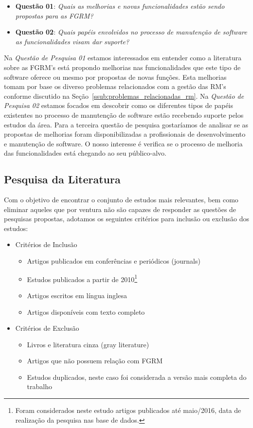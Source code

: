 \begin{itemize}
	\item \textbf{Questão 01}: \textit{Quais as melhorias e novas
			funcionalidades estão sendo propostas para as FGRM?}
   	\item \textbf{Questão 02}: \textit{Quais papéis
			envolvidos no processo de manutenção de software as funcionalidades visam
			dar suporte?}
\end{itemize}

Na \textit{Questão de Pesquisa 01} estamos interessados em entender como a
literatura sobre as FGRM's está propondo melhorias nas funcionalidades que este
tipo de software oferece ou mesmo por propostas de novas funções. Esta melhorias
tomam por base os diverso problemas relacionados com a gestão das RM's conforme
discutido na Seção~\ref{ssub:problemas_relacionadas_rm}. Na \textit{Questão de
	Pesquisa 02} estamos focados em descobrir como os diferentes tipos de papéis
existentes no processo de manutenção de software estão recebendo suporte pelos
estudos da área. Para a terceira questão de pesquisa gostaríamos de analisar se
as propostas de melhorias foram disponibilizadas a profissionais de
desenvolvimento e manutenção de software. O nosso interesse é verifica se o
processo de melhoria das funcionalidades está chegando ao seu público-alvo.

\subsection{Pesquisa da Literatura}
\label{subsec:map-pesquisa-literatura}

Com o objetivo de encontrar o conjunto de estudos mais relevantes, bem como
eliminar aqueles que por ventura não são capazes de responder as questões de
pesquisas propostas, adotamos os seguintes critérios para inclusão ou exclusão
dos estudos:

\begin{itemize}
	\item Critérios de Inclusão
		\begin{itemize}
			\item Artigos
				publicados em conferências e periódicos (journals)
			\item Estudos
				publicados a partir de 2010\footnote{Foram considerados neste
					estudo artigos publicados até maio/2016, data de realização
					da pesquisa nas base de dados.}
			\item Artigos escritos em
				língua inglesa
			\item Artigos disponíveis com texto
				completo
		\end{itemize}
	\item Critérios de Exclusão
		\begin{itemize}
			\item Livros e literatura cinza (gray literature)
			\item Artigos que não possuem relação com FGRM
			\item Estudos duplicados, neste caso foi considerada a versão mais
				completa do trabalho
		\end{itemize}
\end{itemize}

